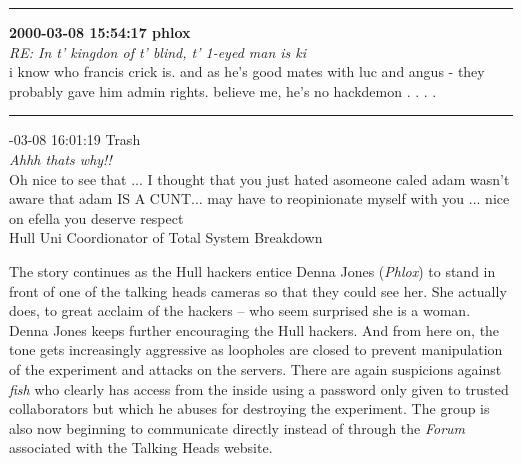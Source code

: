 \begin{mail}
\rule{0.8\textwidth}{.4pt}

{\bf2000-03-08 15:54:17	phlox}\\
{\itshape RE: In t' kingdon of t' blind, t' 1-eyed man is ki}\\
i know who francis crick is. and as he's good mates with luc and angus - they probably gave him admin rights. believe me, he's no hackdemon . . . .	\\

\rule{0.8\textwidth}{.4pt}

{-03-08 16:01:19 Trash}\\
{\itshape Ahhh thats why!!}\\
Oh nice to see that ...  I thought that you just hated asomeone caled adam wasn't aware that adam IS A CUNT... 
may have to reopinionate myself with you ...  nice on efella you deserve respect \\
Hull Uni Coordionator of Total System Breakdown

\end{mail}

 
The story continues as the Hull hackers entice Denna Jones ({\it Phlox}) to stand in front of one of 
the talking heads cameras so that they could see her. She actually does, to great acclaim of the hackers -- who 
seem surprised she is a woman. Denna Jones keeps further encouraging the Hull hackers. 
And from here on, the tone gets increasingly aggressive as loopholes are closed to prevent manipulation of the experiment
and attacks on the servers. There are again suspicions against {\it fish} who clearly has access from the inside using 
a password only given to trusted collaborators but which he abuses for destroying the experiment. The group is also now
beginning to communicate directly instead of through the {\it Forum} associated with the Talking Heads website.

